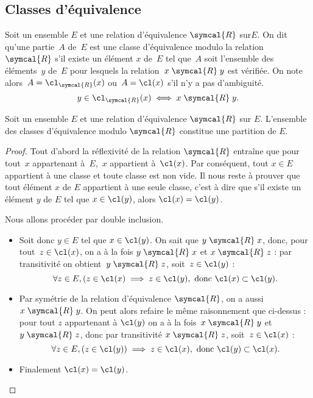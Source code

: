 \subsection{Classes d'équivalence}
Soit un ensemble $E$ et une relation d'équivalence $\symcal{R}$ sur$E$. On dit qu'une partie~$A$ de~$E$ est une classe d'équivalence modulo la relation~$\symcal{R}$ s'il existe un élément $x$ de~$E$ tel que~$A$ soit l'ensemble des éléments~$y$ de~$E$ pour lesquels la relation~$x\mathrel{\symcal{R}}y$ est vérifiée. On note alors~$A=\cl_{\symcal{R}} (x)$ ou~$A=\cl (x)$ s'il n'y a pas d'ambiguité.
\[y\in\cl_{\symcal{R}} (x)\iff x\mathrel{\symcal{R}}y.\]

\begin{thm}
Soit un ensemble $E$ et une relation d'équivalence $\symcal{R}$ sur $E$. L'ensemble des classes d'équivalence modulo $\symcal{R}$ constitue une partition de $E$.
\end{thm}

\begin{proof}
Tout d'abord la réflexivité de la relation $\symcal{R}$ entraîne que pour tout~$x$ appartenant à~$E$,~$x$ appartient à~$\cl(x)$. Par conséquent, tout $x\in E$ appartient à une classe et toute classe est non vide. Il nous reste à prouver que tout élément $x$ de $E$ appartient à une seule classe, c'est à dire que s'il existe un élément $y$ de $E$ tel que $x\in \cl(y)$, alors $\cl(x)=\cl(y)$.

Nous allons procéder par double inclusion.
\begin{itemize}
\item Soit donc $y\in E$ tel que $x\in\cl(y)$. On sait que $y\mathrel{\symcal{R}}x$, donc,
pour tout~$z\in \cl(x)$, on a à la fois $y\mathrel{\symcal{R}}x$ et $x\mathrel{\symcal{R}}z$ : par transitivité on obtient~$y\mathrel{\symcal{R}}z$, soit~$z\in\cl(y)$ :
\[\forall z\in E, (z\in\cl(x)\implies z\in\cl(y), \text{ donc }\cl (x)\subset\cl (y).\]
 \item Par symétrie de la relation d'équivalence $\symcal{R}$, on a aussi~$x\mathrel{\symcal{R}}y$. On peut alors refaire le même raisonnement que ci-dessus : 
 pour tout $z$ appartenant à $\cl(y)$ on a  à la fois~$x\mathrel{\symcal{R}}y$ et~$y\mathrel{\symcal{R}}z$, 
 donc par transitivité $x\mathrel{\symcal{R}}z$, soit~\mbox{$z\in\cl(x)$} :
\[\forall z\in E, (z\in\cl(y))\implies z\in\cl(x), \text{ donc }\cl (y)\subset\cl (x).\]
\item Finalement $\cl(x)=\cl(y)$.\qedhere
\end{itemize}
\end{proof}

